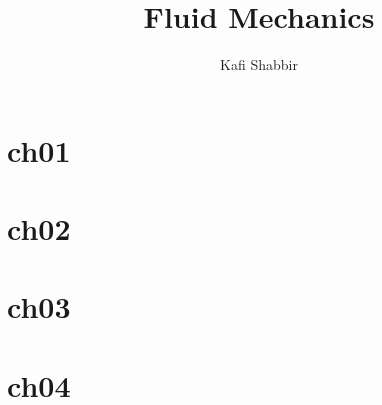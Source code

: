 \documentclass[
	12pt
] {book}
\title{Fluid Mechanics}
\author{Kafi Shabbir}
\begin{document}
	\maketitle
	\tableofcontents
	
	\chapter{ch01}
		
		
	\chapter{ch02}
		
		
	\chapter{ch03}
		

	\chapter{ch04} 
		
	
\end{document}
